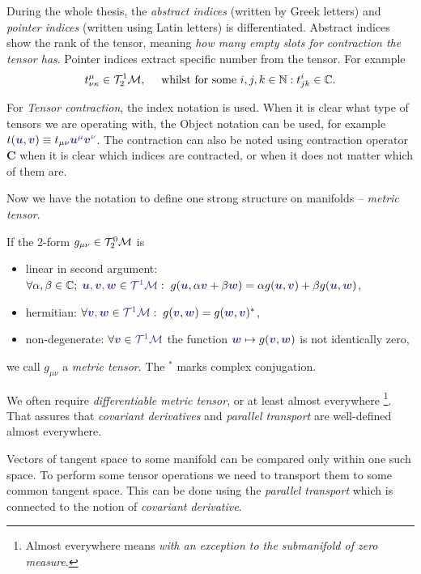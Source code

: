 During the whole thesis, the \emph{abstract indices} (written by Greek letters) and \emph{pointer indices} (written using Latin letters) is differentiated. Abstract indices show the rank of the tensor, meaning \emph{how many empty slots for contraction the tensor has}. Pointer indices extract specific number from the tensor. For example
$$t^\mu_{\nu\kappa} \in \mathcal{T}^1_2\mathcal{M}, \quad \text{ whilst for some }i,j,k\in\mathbb{N}: t^i_{jk}\in \mathbb C.$$

For \emph{Tensor contraction}, the index notation is used. When it is clear what type of tensors we are operating with, the Object notation can be used, for example $t(\bluee{\bm u},\bluee{\bm v})\equiv t_{\mu\nu}\bluee{\bm u^\mu \bm v^\nu}$. The contraction can also be noted using contraction operator $\mathbf C$ when it is clear which indices are contracted, or when it does not matter which of them are.

Now we have the notation to define one strong structure on manifolds -- \emph{metric tensor}. 
\begin{definition}
If the 2-form $g_{\mu\nu}\in\mathcal{T}^0_2\mathcal{M}$ is
\begin{itemize}
    \item linear in second argument: $\forall \alpha,\beta\in\C;\; \bluee{\bm u,\bm v,\bm w}\in \bluee{\TT^1\M}: \; g(\bluee{\bm u},\alpha\bluee{\bm v}+\beta \bluee{\bm w}) = \alpha g(\bluee{\bm u},\bluee{\bm v})+\beta g(\bluee{\bm u},\bluee{\bm w})$,
    \item hermitian: $\forall \bluee{\bm v,\bm w}\in \bluee{\TT^1\M}: \; g(\bluee{\bm v},\bluee{\bm w})=g(\bluee{\bm w},\bluee{\bm v})^*$,
    \item non-degenerate: $\forall \bluee{\bm v}\in\bluee{\TT^1\M}$ the function $\bluee{\bm w}\mapsto g(\bluee{\bm v},\bluee{\bm w})$ is not identically zero,
\end{itemize} 
we call $g_{\mu\nu}$ a \emph{metric tensor}. The $^*$ marks complex conjugation.
\end{definition}

We often require \emph{differentiable metric tensor}, or at least almost everywhere \footnote{Almost everywhere means \emph{with an exception to the submanifold of zero measure}.}. That assures that \emph{covariant derivatives} and \emph{parallel transport} are well-defined almost everywhere. 




Vectors of tangent space to some manifold can be compared only within one such space. To perform some tensor operations we need to transport them to some common tangent space. This can be done using the \emph{parallel transport} which is connected to the notion of \emph{covariant derivative}.

